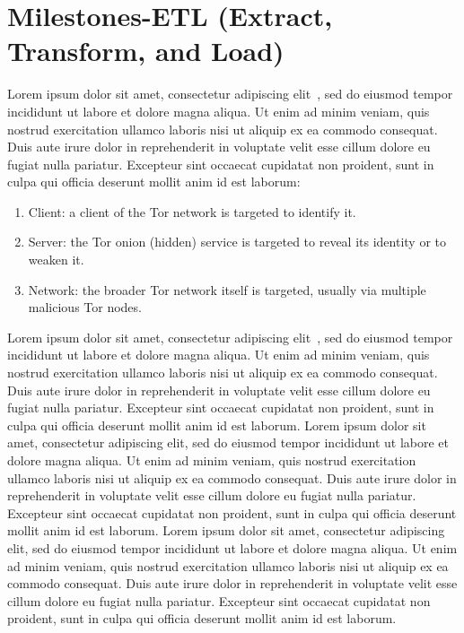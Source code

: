 \documentclass[letterpaper, 10 pt, conference]{ieeeconf}  %
\begin{document}
\section{Milestones-ETL (Extract, Transform, and Load)}

Lorem ipsum dolor sit amet, consectetur adipiscing elit~\cite{Cite12}, sed do eiusmod tempor incididunt ut labore et dolore magna aliqua. Ut enim ad minim veniam, quis nostrud exercitation ullamco laboris nisi ut aliquip ex ea commodo consequat. Duis aute irure dolor in reprehenderit in voluptate velit esse cillum dolore eu fugiat nulla pariatur. Excepteur sint occaecat cupidatat non proident, sunt in culpa qui officia deserunt mollit anim id est laborum:

\begin{enumerate}
	\item Client: a client of the Tor network is targeted to identify it.
	\item Server: the Tor onion (hidden) service is targeted to reveal its identity or to weaken it.
	\item Network: the broader Tor network itself is targeted, usually via multiple malicious Tor nodes.
\end{enumerate}

Lorem ipsum dolor sit amet, consectetur adipiscing elit~\cite{Cite13}, sed do eiusmod tempor incididunt ut labore et dolore magna aliqua. Ut enim ad minim veniam, quis nostrud exercitation ullamco laboris nisi ut aliquip ex ea commodo consequat. Duis aute irure dolor in reprehenderit in voluptate velit esse cillum dolore eu fugiat nulla pariatur. Excepteur sint occaecat cupidatat non proident, sunt in culpa qui officia deserunt mollit anim id est laborum. Lorem ipsum dolor sit amet, consectetur adipiscing elit, sed do eiusmod tempor incididunt ut labore et dolore magna aliqua. Ut enim ad minim veniam, quis nostrud exercitation ullamco laboris nisi ut aliquip ex ea commodo consequat. Duis aute irure dolor in reprehenderit in voluptate velit esse cillum dolore eu fugiat nulla pariatur. Excepteur sint occaecat cupidatat non proident, sunt in culpa qui officia deserunt mollit anim id est laborum. Lorem ipsum dolor sit amet, consectetur adipiscing elit, sed do eiusmod tempor incididunt ut labore et dolore magna aliqua. Ut enim ad minim veniam, quis nostrud exercitation ullamco laboris nisi ut aliquip ex ea commodo consequat. Duis aute irure dolor in reprehenderit in voluptate velit esse cillum dolore eu fugiat nulla pariatur. Excepteur sint occaecat cupidatat non proident, sunt in culpa qui officia deserunt mollit anim id est laborum.
\end{document}

